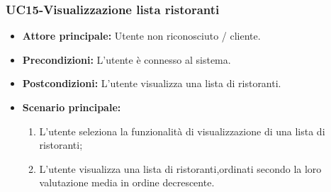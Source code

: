 \subsubsection{UC15-Visualizzazione lista ristoranti}
\begin{itemize}
\item \textbf{Attore principale:} Utente non riconosciuto / cliente.
\item \textbf{Precondizioni:} L'utente è connesso al sistema.
\item \textbf{Postcondizioni:} L'utente visualizza una lista di ristoranti.
\item \textbf{Scenario principale:}
\begin{enumerate}
    \item L'utente seleziona la funzionalità di visualizzazione di una lista di ristoranti;
    \item L'utente visualizza una lista di ristoranti,ordinati secondo la loro valutazione media in ordine decrescente.
\end{enumerate}
\end{itemize}

